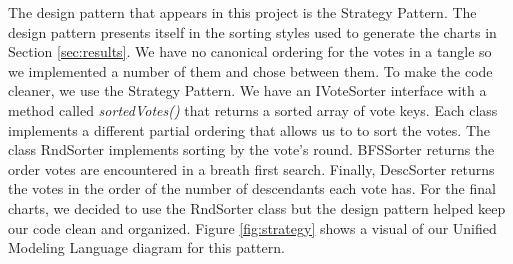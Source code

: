 The design pattern that appears in this project is the Strategy Pattern.
The design pattern presents itself in the sorting styles used to generate the charts in Section \ref{sec:results}.
We have no canonical ordering for the votes in a tangle so we implemented a number of them and chose between them.
To make the code cleaner, we use the Strategy Pattern.
We have an IVoteSorter interface with a method called \textit{sortedVotes()} that returns a sorted array of vote keys.
Each class implements a different partial ordering that allows us to to sort the votes.
The class RndSorter implements sorting by the vote's round.
BFSSorter returns the order votes are encountered in a breath first search.
Finally, DescSorter returns the votes in the order of the number of descendants each vote has.
For the final charts, we decided to use the RndSorter class but the design pattern helped keep our code clean and organized.
Figure \ref{fig:strategy} shows a visual of our Unified Modeling Language diagram for this pattern.



